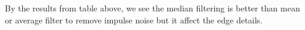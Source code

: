 By the results from table above, we see the median filtering is better than mean or average filter to remove impulse noise but it affect the edge details.



\vspace*{2cm}






\vspace*{2cm}


\vspace*{1cm}




\vspace*{1cm}



\vspace*{1cm}


